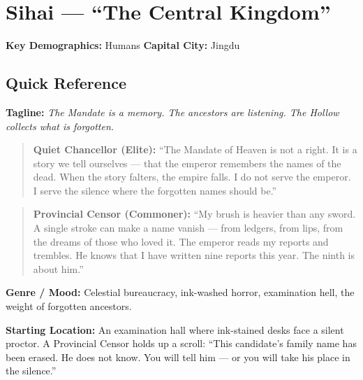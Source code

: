 \section{Sihai --- ``The Central Kingdom''}
\label{chap:sihai}

\textbf{Key Demographics: } Humans
\textbf{Capital City: } Jingdu

\subsection*{Quick Reference}
\textbf{Tagline:} \textit{The Mandate is a memory. The ancestors are listening. The Hollow collects what is forgotten.}

\begin{quote}
  \textbf{Quiet Chancellor (Elite):}  
  ``The Mandate of Heaven is not a right. It is a story we tell ourselves --- that the emperor remembers the names of the dead. When the story falters, the empire falls. I do not serve the emperor. I serve the silence where the forgotten names should be.''
\end{quote}

\begin{quote}
  \textbf{Provincial Censor (Commoner):}  
  ``My brush is heavier than any sword. A single stroke can make a name vanish --- from ledgers, from lips, from the dreams of those who loved it. The emperor reads my reports and trembles. He knows that I have written nine reports this year. The ninth is about him.''
\end{quote}

\noindent\textbf{Genre / Mood:} Celestial bureaucracy, ink-washed horror, examination hell, the weight of forgotten ancestors.

\noindent\textbf{Starting Location:} An examination hall where ink-stained desks face a silent proctor. A Provincial Censor holds up a scroll: ``This candidate's family name has been erased. He does not know. You will tell him --- or you will take his place in the silence.''

